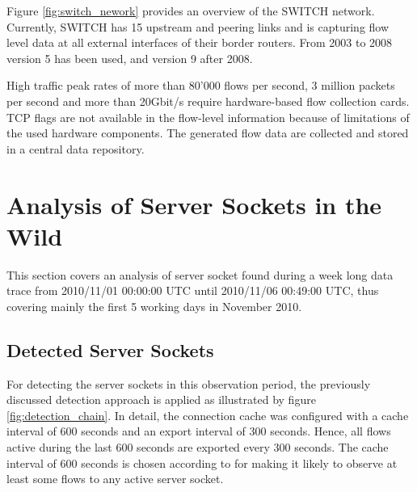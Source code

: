 Figure \ref{fig:switch_nework} provides an overview of the SWITCH network. 
Currently, SWITCH has 15 upstream and peering links and is capturing flow level data at all external interfaces of their border routers. From 2003 to 2008 version 5 has been used, and version 9 after 2008\citep{Schatzmann:Tracing}.

High traffic peak rates of more than 80'000 flows per second, 3 million packets per second and more than 20Gbit/s require hardware-based flow collection cards\citep{Schatzmann:Tracing}. 
\gls{TCP} flags are not available in the flow-level information because of limitations of the used hardware components\citep{Schatzmann:Tracing}. 
The generated flow data are collected and stored in a central data repository.

\section{Analysis of Server Sockets in the Wild\label{section:analysis_in_wild}}

This section covers an analysis of \gls{server socket} found during a week long data trace from 2010/11/01 00:00:00 UTC until 2010/11/06 00:49:00 UTC, thus covering mainly the first 5 working days in November 2010.

\subsection{Detected Server Sockets}

For detecting the \glspl{server socket} in this observation period, the previously discussed detection approach is applied as illustrated by figure \ref{fig:detection_chain}. 
In detail, the connection cache was configured with a cache interval of 600 seconds and an export interval of 300 seconds. Hence, all flows active during the last 600 seconds are exported every 300 seconds. The cache interval of 600 seconds is chosen according to \citet{Schatzmann:Tracing} for making it likely to observe at least some flows to any active server socket. 

